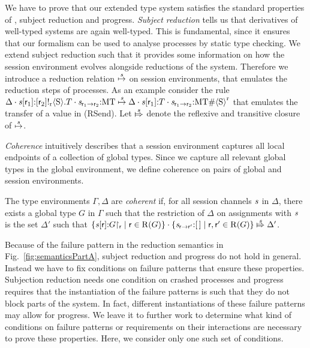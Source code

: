 We have to prove that our extended type system satisfies the standard properties of \MPST, \ie subject reduction and progress.
\emph{Subject reduction} tells us that derivatives of well-typed systems are again well-typed.
This is fundamental, since it ensures that our formalism can be used to analyse processes by static type checking.
We extend subject reduction such that it provides some information on how the session environment evolves alongside reductions of the system.
Therefore we introduce a reduction relation $ \stackrel{\mathit{s}}{\mapsto} $ on session environments, that emulates the reduction steps of processes.
As an example consider the rule
$ \Delta \cdot \mathit{s}{\left[ \mathsf{r}_1 \right]}{:}{\left[ \mathsf{r}_2 \right]}\mathsf{!}_{\operatorname{r}}{\left< \mathrm{S} \right>}.T \cdot \mathit{s}_{\mathsf{r}_1 \to \mathsf{r}_2}{:}\mathrm{MT} \stackrel{\mathit{s}}{\mapsto} \Delta \cdot \mathit{s}{\left[ \mathsf{r}_1 \right]}{:}T \cdot \mathit{s}_{\mathsf{r}_1 \to \mathsf{r}_2}{:}\mathrm{MT}\#{\left< \mathrm{S} \right>^{\operatorname{r}}} $
that emulates the transfer of a value in (\textsf{RSend}).
Let $ \stackrel{\mathit{s}}{\Mapsto} $ denote the reflexive and transitive closure of $ \stackrel{\mathit{s}}{\mapsto} $.

\emph{Coherence} intuitively describes that a session environment captures all local endpoints of a collection of global types.
Since we capture all relevant global types in the global environment, we define
coherence on pairs of global and session environments.

\begin{definition}[Coherence]
	\label{def:coherence}
	The type environments $ \Gamma, \Delta $ are \emph{coherent} if, for all session channels $ \mathit{s} $ in $ \Delta $, there exists a global type $ G $ in $ \Gamma $ such that the restriction of $ \Delta $ on assignments with $ \mathit{s} $ is the set $ \Delta' $ such that $ \left\lbrace   \mathit{s}{\left[ \mathsf{r} \right]}{:}{G}{\restriction_{\mathsf{r}}} \mid \mathsf{r} \in \operatorname{R}\!\left( G \right)   \right\rbrace \cdot \left\lbrace   \mathit{s}_{\mathsf{r} \to \mathsf{r}'}{:}[\,] \mid \mathsf{r}, \mathsf{r}' \in \operatorname{R}\!\left( G \right)   \right\rbrace \stackrel{\mathit{s}}{\Mapsto} \Delta' $.
\end{definition}

Because of the failure pattern in the reduction semantics in Fig.~\ref{fig:semanticsPartA}, subject reduction and progress do not hold in general.
Instead we have to fix conditions on failure patterns that ensure these properties.
Subjection reduction needs one condition on crashed processes and progress requires that the instantiation of the failure patterns is such that they do not block parts of the system.
In fact, different instantiations of these failure patterns may allow for progress. We leave it to further work to determine what kind of conditions on failure patterns or requirements on their interactions are necessary to prove these properties. Here, we consider only one such set of conditions.

